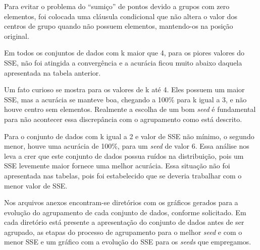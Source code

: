 \documentclass[12pt, a4paper]{article}
\begin{document}
Para evitar o problema do ``sumiço'' de pontos devido a grupos com zero elementos, foi colocada uma cláusula condicional que não altera o valor dos centros de grupo quando não possuem elementos, mantendo-os na posição original.

Em todos os conjuntos de dados com k maior que 4, para os piores valores do SSE, não foi atingida a convergência e a acurácia ficou muito abaixo daquela apresentada na tabela anterior.

Um fato curioso se mostra para os valores de k até 4. Eles possuem um maior SSE, mas a acurácia se manteve boa, chegando a 100\% para k igual a 3, e não houve centro sem elementos. Realmente a escolha de um bom \emph{seed} é fundamental para não acontecer essa discrepância com o agrupamento como está descrito.

Para o conjunto de dados com k igual a 2 e valor de SSE não mínimo, o segundo menor, houve uma acurácia de 100\%, para um \emph{seed} de valor 6. Essa análise nos leva a crer que este conjunto de dados possua ruídos na distribuição, pois um SSE levemente maior fornece uma melhor acurácia. Essa situação não foi apresentada nas tabelas, pois foi estabelecido que se deveria trabalhar com o menor valor de SSE.

Nos arquivos anexos encontram-se diretórios com os gráficos gerados para a evolução do agrupamento de cada conjunto de dados, conforme solicitado. Em cada diretório está presente a apresentação do conjunto de dados antes de ser agrupado, as etapas do processo de agrupamento para o melhor \textit{seed} e com o menor SSE e um gráfico com a evolução do SSE para os \emph{seeds} que empregamos.
\end{document}
